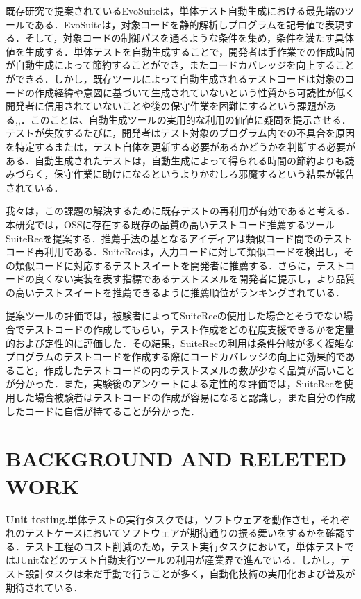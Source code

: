 \documentclass[conference]{IEEEtran}
\begin{document}
既存研究で提案されているEvoSuite\cite{b3}は，単体テスト自動生成における最先端のツールである．EvoSuiteは，対象コードを静的解析しプログラムを記号値で表現する．そして，対象コードの制御パスを通るような条件を集め，条件を満たす具体値を生成する．単体テストを自動生成することで，開発者は手作業での作成時間が自動生成によって節約することができ，またコードカバレッジを向上することができる．しかし，既存ツールによって自動生成されるテストコードは対象のコードの作成経緯や意図に基づいて生成されていないという性質から可読性が低く開発者に信用されていないことや後の保守作業を困難にするという課題がある\cite{b13},\cite{b14},\cite{b15}．このことは、自動生成ツールの実用的な利用の価値に疑問を提示させる．テストが失敗するたびに，開発者はテスト対象のプログラム内での不具合を原因を特定するまたは，テスト自体を更新する必要があるかどうかを判断する必要がある．自動生成されたテストは，自動生成によって得られる時間の節約よりも読みづらく，保守作業に助けになるというよりかむしろ邪魔するという結果が報告されている\cite{b1}．

我々は，この課題の解決するために既存テストの再利用が有効であると考える．本研究では，OSSに存在する既存の品質の高いテストコード推薦するツールSuiteRecを提案する．推薦手法の基となるアイディアは類似コード間でのテストコード再利用である．SuiteRecは，入力コードに対して類似コードを検出し，その類似コードに対応するテストスイートを開発者に推薦する．さらに，テストコードの良くない実装を表す指標であるテストスメルを開発者に提示し，より品質の高いテストスイートを推薦できるように推薦順位がランキングされている．

提案ツールの評価では，被験者によってSuiteRecの使用した場合とそうでない場合でテストコードの作成してもらい，テスト作成をどの程度支援できるかを定量的および定性的に評価した．その結果，SuiteRecの利用は条件分岐が多く複雑なプログラムのテストコードを作成する際にコードカバレッジの向上に効果的であること，作成したテストコードの内のテストスメルの数が少なく品質が高いことが分かった．また，実験後のアンケートによる定性的な評価では，SuiteRecを使用した場合被験者はテストコードの作成が容易になると認識し，また自分の作成したコードに自信が持てることが分かった．


\section{BACKGROUND AND RELETED WORK}
\textbf{Unit testing.}単体テストの実行タスクでは，ソフトウェアを動作させ，それぞれのテストケースにおいてソフトウェアが期待通りの振る舞いをするかを確認する．テスト工程のコスト削減のため，テスト実行タスクにおいて，単体テストではJUnitなどのテスト自動実行ツールの利用が産業界で進んでいる．しかし，テスト設計タスクは未だ手動で行うことが多く，自動化技術の実用化および普及が期待されている．
\end{document}

